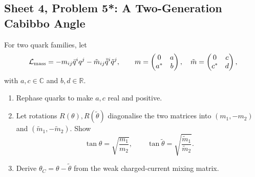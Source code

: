 \subsection{Sheet 4, Problem 5*: A Two-Generation Cabibbo Angle}

For two quark families, let
\begin{equation}
    \mathcal L_{\rm mass}
    =-m_{ij}\bar q^{i}q^j
    -\tilde m_{ij}\bar{\tilde q}^{i}\tilde q^{j},
    \qquad
    m=\begin{pmatrix}0&a\\a^*&b\end{pmatrix},
    \quad
    \tilde m=\begin{pmatrix}0&c\\c^*&d\end{pmatrix},
\end{equation}
with $a,c\in\mathbb C$ and $b,d\in\mathbb R$.
\begin{enumerate}[label=\roman*)]
    \item Rephase quarks to make $a,c$ real and positive.
    \item Let rotations $R(\theta),R(\tilde\theta)$ diagonalise the
    two matrices into $(m_1,-m_2)$ and
    $(\tilde m_1,-\tilde m_2)$. Show
    \begin{equation}
        \tan\theta=\sqrt{\frac{m_1}{m_2}},
        \qquad
        \tan\tilde\theta=\sqrt{\frac{\tilde m_1}{\tilde m_2}}.
    \end{equation}
    \item Derive $\theta_C=\theta-\tilde\theta$ from the weak
    charged-current mixing matrix.
\end{enumerate}
